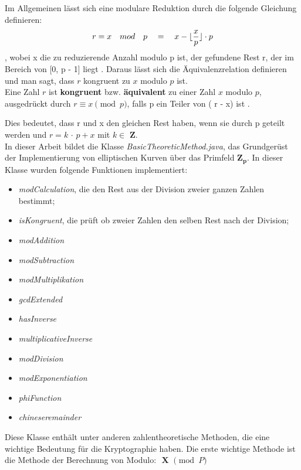 Im Allgemeinen lässt sich eine modulare Reduktion durch die folgende Gleichung definieren: \[ r = x \quad mod \quad p \quad = \quad x - \lfloor\frac{x}{p}\rfloor \cdot p \], wobei x die zu reduzierende Anzahl modulo p ist, der gefundene Rest r, der im Bereich von [0, p - 1] liegt \cite{patent}. Daraus lässt sich die Äquivalenzrelation definieren und man sagt, dass $ r $ kongruent zu $ x $ modulo $ p $ ist.\\

Eine Zahl $ r $ ist \textbf{kongruent} bzw. \textbf{äquivalent} zu einer Zahl $ x $ modulo $ p $, ausgedrückt durch \( r \equiv x \pmod{p} \), falls p ein Teiler von ( r - x) ist \cite{damer}. 



Dies bedeutet, dass r und x den gleichen Rest haben, wenn sie durch p geteilt werden und $ r = k $ $\cdot $ $ p + x $ mit  $ k \in $ $ \mathbf{Z} $.\\



In dieser Arbeit bildet  die Klasse \textit{BasicTheoreticMethod.java}, das Grundgerüst der Implementierung von elliptischen Kurven über das Primfeld $\mathbf{ Z_p} $. 
In dieser Klasse wurden folgende Funktionen implementiert:
\begin{itemize}
    \item \textit{modCalculation}, die den Rest aus der Division zweier ganzen Zahlen bestimmt; 
    \item \textit{isKongruent}, die prüft ob zweier Zahlen den selben Rest nach der Division;
    \item \textit{modAddition}
    \item \textit{modSubtraction}
    \item \textit{modMultiplikation}
    \item \textit{gcdExtended}
    \item \textit{hasInverse}
    \item \textit{multiplicativeInverse}
    \item \textit{modDivision}
    \item \textit{modExponentiation}
    \item \textit{phiFunction}
    \item \textit{chineseremainder}
\end{itemize}

Diese Klasse enthält unter anderen zahlentheoretische Methoden, die eine wichtige Bedeutung für die Kryptographie haben.
Die erste wichtige Methode ist die Methode der Berechnung von Modulo: $\textbf{ X $\pmod P $} $

